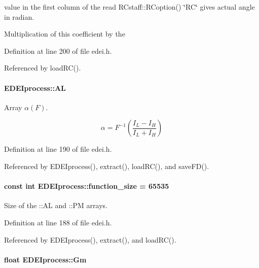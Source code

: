 value in the first column of the read RCstaff::RCoption() \char`\"{}RC\char`\"{} gives actual angle in radian. 

Multiplication of this coefficient by the 

Definition at line 200 of file edei.h.



Referenced by loadRC().

\hypertarget{classEDEIprocess_a27cf3442a11ba3d9e9ca9f4137f61265}{
\paragraph[{AL}]{ {\bf EDEIprocess::AL}}\hfill}
\label{classEDEIprocess_a27cf3442a11ba3d9e9ca9f4137f61265}


Array $\alpha(F)$. 

\[ \alpha = F^{-1}\left( \frac{I_L-I_H}{I_L+I_H} \right) \] 

Definition at line 190 of file edei.h.



Referenced by EDEIprocess(), extract(), loadRC(), and saveFD().

\hypertarget{classEDEIprocess_a5261e1cab3a15f020b86594303f2c28c}{
\paragraph[{function\_\-size}]{\setlength{\rightskip}{0pt plus 5cm}const int {\bf EDEIprocess::function\_\-size} = 65535}\hfill}
\label{classEDEIprocess_a5261e1cab3a15f020b86594303f2c28c}


Size of the ::AL and ::PM arrays. 



Definition at line 188 of file edei.h.



Referenced by EDEIprocess(), extract(), and loadRC().

\hypertarget{classEDEIprocess_a5f7a6ba365d7b383a2b6c12a344230a2}{
\paragraph[{Gm}]{\setlength{\rightskip}{0pt plus 5cm}float {\bf EDEIprocess::Gm}}\hfill}
\label{classEDEIprocess_a5f7a6ba365d7b383a2b6c12a344230a2}


